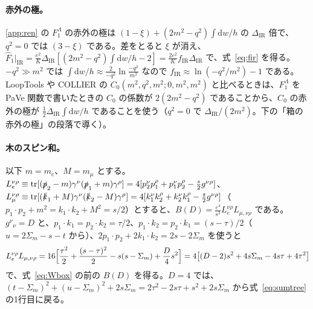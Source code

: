 \documentclass[a4paper,10pt]{ltjsarticle}
\newcommand{\dd}{\mathrm{d}}
\newcommand{\DIR}{\Delta_{\mathrm{IR}}}
\begin{document}
\paragraph{赤外の極。}\ref{app:ren} の $F_1^\Lambda$ の赤外の極は $(1-\xi)+(2m^2-q^2)\int\dd w/h$ の $\DIR$ 倍で、$q^2=0$ では $(3-\xi)$ である。差をとると $\xi$ が消え、$\hat F_1|_{\mathrm{IR}}=\frac{e^2}{K}\DIR[(2m^2-q^2)\int\dd w/h-2]=\frac{2e^2}{K}f_{\mathrm{IR}}\DIR$ で、式~\eqref{eq:fir} を得る。$-q^2\gg m^2$ では $\int\dd w/h\approx\frac{2}{-q^2}\ln\frac{-q^2}{m^2}$ なので $f_{\mathrm{IR}}\approx\ln(-q^2/m^2)-1$ である。LoopTools や COLLIER の $C_0(m^2,q^2,m^2;0,m^2,m^2)$ と比べるときは、$F_1^\Lambda$ を PaVe 関数で書いたときの $C_0$ の係数が $2(2m^2-q^2)$ であることから、$C_0$ の赤外の極が $\frac12\DIR\int\dd w/h$ であることを使う（$q^2=0$ で $\DIR/(2m^2)$。下の「箱の赤外の極」の段落で導く）。

\paragraph{木のスピン和。}以下 $m=m_e$、$M=m_\mu$ とする。$L_e^{\nu\rho}\equiv\mathrm{tr}[(\slashed p_2-m)\gamma^\nu(\slashed p_1+m)\gamma^\rho]=4[p_2^\nu p_1^\rho+p_1^\nu p_2^\rho-\frac s2g^{\nu\rho}]$、$L_\mu^{\nu\rho}\equiv\mathrm{tr}[(\slashed k_1+M)\gamma^\nu(\slashed k_2-M)\gamma^\rho]=4[k_1^\nu k_2^\rho+k_2^\nu k_1^\rho-\frac s2g^{\nu\rho}]$（$p_1\cdot p_2+m^2=k_1\cdot k_2+M^2=s/2$）とすると、$B(D)=\frac{e^4}{s^2}L_e^{\nu\rho}L_{\mu,\nu\rho}$ である。$g^\nu{}_\nu=D$ と、$p_1\cdot k_1=p_2\cdot k_2=\tau/2$、$p_1\cdot k_2=p_2\cdot k_1=(s-\tau)/2$（$u=2\Sigma_m-s-t$ から）、$2p_1\cdot p_2+2k_1\cdot k_2=2s-2\Sigma_m$ を使うと
\begin{equation*}
L_e^{\nu\rho}L_{\mu,\nu\rho}=16\Bigl[\frac{\tau^2}{2}+\frac{(s-\tau)^2}{2}-s(s-\Sigma_m)+\frac D4s^2\Bigr]=4\bigl[(D-2)s^2+4s\Sigma_m-4s\tau+4\tau^2\bigr]
\end{equation*}
で、式~\eqref{eq:Wbox} の前の $B(D)$ を得る。$D=4$ では、$(t-\Sigma_m)^2+(u-\Sigma_m)^2+2s\Sigma_m=2\tau^2-2s\tau+s^2+2s\Sigma_m$ から式~\eqref{eq:sumtree} の1行目に戻る。
\end{document}
